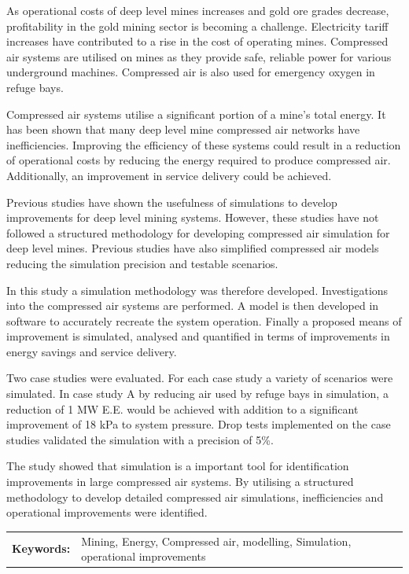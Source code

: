 \documentclass[12pt, english, oneside, open=any,draft=false ]{report}%
\begin{document}
	 As operational costs of deep level mines increases and gold ore grades decrease, profitability in the gold mining sector is becoming a challenge. Electricity tariff increases have contributed to a rise in the cost of operating mines. Compressed air systems are utilised on mines as they provide safe, reliable  power for various underground machines. Compressed air is also used for emergency oxygen in refuge bays.
	 \par
	 Compressed air systems utilise a significant portion of a mine's total energy. It has been shown that many deep level mine compressed air networks have inefficiencies. Improving the efficiency of these systems could result in a reduction of operational costs by reducing the energy required to produce compressed air. Additionally, an improvement in service delivery could be achieved. 
	 \par
	Previous studies have shown the usefulness of simulations to develop improvements for deep level mining systems. However, these studies have not followed a structured methodology for developing compressed air simulation for deep level mines. Previous studies have also simplified compressed air models reducing the simulation precision and testable scenarios. 
	\par
	 In this study a simulation methodology was therefore developed. Investigations into the compressed air systems are performed. A model is then developed in software to accurately recreate the system operation. Finally a proposed means of improvement is simulated, analysed and quantified in terms of improvements in energy savings and service delivery.
	 \par
	 Two case studies were evaluated. For each case study a variety of scenarios were simulated. In case study A by reducing air used by refuge bays in simulation, a reduction of 1 MW E.E. would be achieved with addition to a significant improvement of 18 kPa to system pressure. Drop tests implemented on the case studies validated the simulation with a precision of 5\%. 
	 \par
	 The study showed that simulation is a important tool for identification improvements in large compressed air systems. By utilising a structured methodology to develop detailed compressed air simulations, inefficiencies and operational improvements were identified.   
	 \par
	\begin{tabular}{p{2.35cm}p{13.35cm}}
		\textbf{Keywords:} & Mining, Energy, Compressed air, modelling, Simulation, operational improvements  \\
	\end{tabular}
\clearpage
\end{document}
